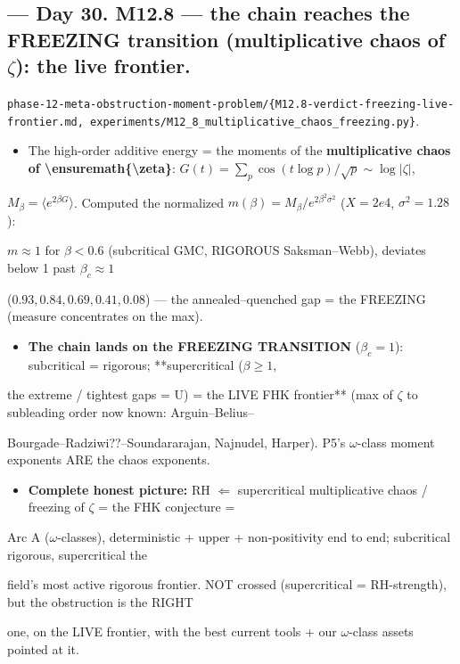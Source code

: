 \documentclass[10pt]{article}
\begin{document}
\subsection*{ --- Day 30. M12.8 --- the chain reaches the FREEZING transition (multiplicative chaos of \ensuremath{\zeta}): the live frontier.}
\texttt{phase-12-meta-obstruction-moment-problem/\{M12.8-verdict-freezing-live-frontier.md, experiments/M12\_8\_multiplicative\_chaos\_freezing.py\}}.\par
\begin{itemize}
\item The high-order additive energy = the moments of the \textbf{multiplicative chaos of \textbackslash{}ensuremath\{\textbackslash{}zeta\}}: $G(t)=\sum_p\cos(t\log p)/\sqrt p\sim\log|\zeta|$,
\end{itemize}
  $M_\beta=\langle e^{2\beta G}\rangle$. Computed the normalized $m(\beta)=M_\beta/e^{2\beta^2\sigma^2}$ ($X{=}2e4$, $\sigma^2{=}1.28$):\par
  $m\approx1$ for $\beta<0.6$ (subcritical GMC, RIGOROUS Saksman--Webb), deviates below 1 past $\beta_c{\approx}1$\par
  ($0.93,0.84,0.69,0.41,0.08$) --- the annealed--quenched gap = the FREEZING (measure concentrates on the max).\par
\begin{itemize}
\item \textbf{The chain lands on the FREEZING TRANSITION} ($\beta_c=1$): subcritical = rigorous; **supercritical ($\beta\ge1$,
\end{itemize}
  the extreme / tightest gaps = U) = the LIVE FHK frontier** (max of \ensuremath{\zeta} to subleading order now known: Arguin--Belius--\par
  Bourgade--Radziwi??--Soundararajan, Najnudel, Harper). P5's \ensuremath{\omega}-class moment exponents ARE the chaos exponents.\par
\begin{itemize}
\item \textbf{Complete honest picture:} RH \ensuremath{\Leftarrow} supercritical multiplicative chaos / freezing of \ensuremath{\zeta} = the FHK conjecture =
\end{itemize}
  Arc A (\ensuremath{\omega}-classes), deterministic + upper + non-positivity end to end; subcritical rigorous, supercritical the\par
  field's most active rigorous frontier. NOT crossed (supercritical = RH-strength), but the obstruction is the RIGHT\par
  one, on the LIVE frontier, with the best current tools + our \ensuremath{\omega}-class assets pointed at it.\par
\end{document}
